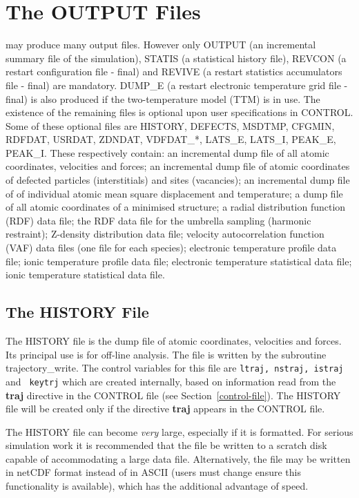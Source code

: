 \section{The OUTPUT Files}
\label{output-files}

\D may produce many output files.  However only OUTPUT
(an incremental summary file of the simulation), STATIS
(a statistical history file), REVCON (a restart configuration
file - final) and REVIVE (a restart statistics accumulators
file - final) are mandatory.  DUMP\_E (a restart electronic
temperature grid file - final) is also produced if the
 two-temperature model (TTM)
is in use. The existence of the remaining files is
optional upon user specifications in CONTROL.  Some of
these optional files are HISTORY, DEFECTS, MSDTMP, CFGMIN,
RDFDAT, USRDAT, ZDNDAT, VDFDAT\_*, LATS\_E, LATS\_I,
PEAK\_E, PEAK\_I.  These respectively contain: an
incremental dump file of all atomic coordinates, velocities
and forces; an incremental dump file of atomic coordinates
of defected particles (interstitials) and sites (vacancies);
an incremental dump file of of individual atomic mean square
displacement and temperature; a dump file of all atomic
coordinates of a minimised structure; a radial distribution
function (RDF) data file; the RDF data file for the umbrella sampling
(harmonic restraint); Z-density distribution data file;
velocity autocorrelation function (VAF) data files (one file for each species);
electronic temperature profile data file; ionic temperature profile data file;
electronic temperature statistical data file;
ionic temperature statistical data file.

\subsection{The HISTORY File}
\label{history-file}

The HISTORY file is the dump file of atomic coordinates, velocities
and forces.  Its principal use is for off-line analysis.  The file
is written by the subroutine {\sc trajectory\_write}.  The control
variables for this file are {\tt ltraj, nstraj, istraj} and {\tt
keytrj} which are created internally, based on information read from
the {\bf traj} directive in the CONTROL file (see Section~\ref{control-file}).
The HISTORY file will be created only if the directive {\bf traj}
appears in the CONTROL file.

The HISTORY file can become {\em very} large, especially if it is
formatted.  For serious simulation work it is recommended that the
file be written to a scratch disk capable of accommodating a large
data file.  Alternatively, the file may be written in netCDF format
instead of in ASCII (users must change ensure this functionality is
available), which has the additional advantage of speed.

